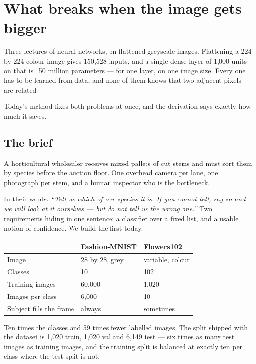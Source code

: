 \documentclass[11pt,a4paper]{article}
\begin{document}

\section{What breaks when the image gets bigger}

Three lectures of neural networks, on flattened greyscale images. Flattening a
224 by 224 colour image gives 150{,}528 inputs, and a single dense layer of
1{,}000 units on that is 150 million parameters --- for one layer, on one image
size. Every one has to be learned from data, and none of them knows that two
adjacent pixels are related.

Today's method fixes both problems at once, and the derivation says exactly how
much it saves.

\subsection{The brief}

A horticultural wholesaler receives mixed pallets of cut stems and must sort
them by species before the auction floor. One overhead camera per lane, one
photograph per stem, and a human inspector who is the bottleneck.

In their words: \emph{``Tell us which of our species it is. If you cannot tell,
say so and we will look at it ourselves --- but do not tell us the wrong
one.''} Two requirements hiding in one sentence: a classifier over a fixed
list, and a usable notion of confidence. We build the first today.

\begin{center}
\small
\begin{tabular}{lll}
\toprule
& \textbf{Fashion-MNIST} & \textbf{Flowers102} \\
\midrule
Image & 28 by 28, grey & variable, colour \\
Classes & 10 & 102 \\
Training images & 60{,}000 & 1{,}020 \\
Images per class & 6{,}000 & 10 \\
Subject fills the frame & always & sometimes \\
\bottomrule
\end{tabular}
\end{center}

Ten times the classes and 59 times fewer labelled images. The split shipped
with the dataset is 1{,}020 train, 1{,}020 val and 6{,}149 test --- six times as
many test images as training images, and the training split is balanced at
exactly ten per class where the test split is not.
\end{document}
